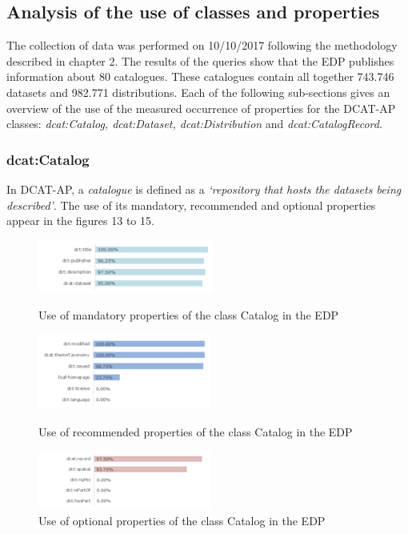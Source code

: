 \documentclass[<options>]{elsarticle}
\begin{document}
\subsection{Analysis of the use of classes and properties}
The collection of data was performed on 10/10/2017 following the methodology described in chapter 2. The results of the queries show that the EDP publishes information about 80 catalogues. These catalogues contain all together 743.746 datasets and 982.771 distributions. Each of the following sub-sections gives an overview of the use of the measured occurrence of properties for the DCAT-AP classes: \textit{dcat:Catalog, dcat:Dataset, dcat:Distribution} and \textit{dcat:CatalogRecord}.

\subsubsection{dcat:Catalog}

In DCAT-AP, a \textit{catalogue} is defined as a \textit{‘repository that hosts the datasets being described’}. The use of its mandatory, recommended and optional properties appear in the figures 13 to 15.

\begin{figure}[H]
\includegraphics{replace16.png}
\caption{Use of mandatory properties of the class Catalog in the EDP}
\includegraphics{replace17.png}
\caption{Use of recommended properties of the class Catalog in the EDP}
\includegraphics{replace18.png}
\caption{Use of optional properties of the class Catalog in the EDP}
\end{figure}
\end{document}
